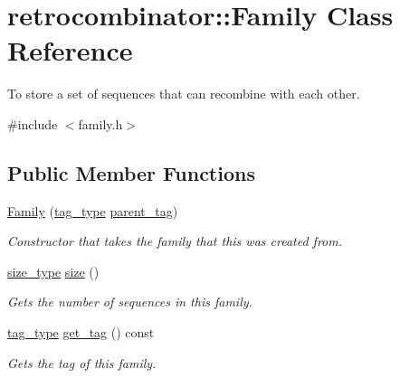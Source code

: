\hypertarget{classretrocombinator_1_1Family}{}\section{retrocombinator\+:\+:Family Class Reference}
\label{classretrocombinator_1_1Family}


To store a set of sequences that can recombine with each other.  




{\ttfamily \#include $<$family.\+h$>$}

\subsection*{Public Member Functions}
\begin{DoxyCompactItemize}
\item 
\hyperlink{classretrocombinator_1_1Family_aefb8619ac695a3ad8e654ed8302668ee}{Family} (\hyperlink{namespaceretrocombinator_afd7c6eb4293e8c4d12827609a9a34b9b}{tag\+\_\+type} \hyperlink{classretrocombinator_1_1Family_aa5885cd6d63468db43859a860f7f16b4}{parent\+\_\+tag})
\begin{DoxyCompactList}\small\item\em Constructor that takes the family that this was created from. \end{DoxyCompactList}\item 
\mbox{\label{classretrocombinator_1_1Family_a0b767536f3a583fbeb77cadcdc1479b2}} 
\hyperlink{namespaceretrocombinator_a8e1541b50cee66a791df4c437ccbb385}{size\+\_\+type} \hyperlink{classretrocombinator_1_1Family_a0b767536f3a583fbeb77cadcdc1479b2}{size} ()
\begin{DoxyCompactList}\small\item\em Gets the number of sequences in this family. \end{DoxyCompactList}\item 
\mbox{\label{classretrocombinator_1_1Family_a11eab2ee12f8291620b230568ac3ab59}} 
\hyperlink{namespaceretrocombinator_afd7c6eb4293e8c4d12827609a9a34b9b}{tag\+\_\+type} \hyperlink{classretrocombinator_1_1Family_a11eab2ee12f8291620b230568ac3ab59}{get\+\_\+tag} () const
\begin{DoxyCompactList}\small\item\em Gets the tag of this family. \end{DoxyCompactList}\item 

\end{DoxyCompactItemize}
